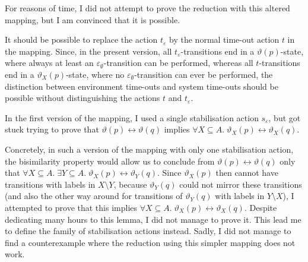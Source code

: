 \begin{isabellebody}
\begin{isamarkuptext}
For reasons of time, I did not attempt to prove the reduction with this altered mapping, but I am convinced that it is possible.%
\end{isamarkuptext}\isamarkuptrue%
%
\isadelimdocument
%
\endisadelimdocument
%
\isatagdocument
%
\isamarkuptrue%
%
\isamarkuptrue%
%
\endisatagdocument
{\isafolddocument}%
%
\isadelimdocument
%
\endisadelimdocument
%
\begin{isamarkuptext}%
It should be possible to replace the action $t_\varepsilon$ by the normal time-out action $t$ in the mapping. Since, in the present version, all $t_\varepsilon$-transitions end in a $\vartheta(p)$-state, where always at least an $\varepsilon_\emptyset$-transition can be performed, whereas all $t$-transitions end in a $\vartheta_X(p)$-state, where no $\varepsilon_\emptyset$-transition can ever be performed, the distinction between environment time-outs and system time-outs should be possible without distinguishing the actions $t$ and $t_\varepsilon$.
\pagebreak%
\end{isamarkuptext}\isamarkuptrue%
%
\isadelimdocument
%
\endisadelimdocument
%
\isatagdocument
%
\isamarkuptrue%
%
\endisatagdocument
{\isafolddocument}%
%
\isadelimdocument
%
\endisadelimdocument
%
\begin{isamarkuptext}%
In the first version of the mapping, I used a single stabilisation action $s_\varepsilon$, but got stuck trying to prove that $\vartheta(p) \leftrightarrow \vartheta(q)$ implies $\forall X \subseteq A .\; \vartheta_X(p) \leftrightarrow \vartheta_X(q)$. 

Concretely, in such a version of the mapping with only one stabilisation action, the bisimilarity property would allow us to conclude from \linebreak $\vartheta(p) \leftrightarrow \vartheta(q)$ only that $\forall X \subseteq A .\; \exists Y \subseteq A .\; \vartheta_X(p) \leftrightarrow \vartheta_Y(q)$. Since $\vartheta_X(p)$ then cannot have transitions with labels in $X \!\setminus\! Y$, because $\vartheta_Y(q)$ could not mirror these transitions (and also the other way around for transitions of $\vartheta_Y(q)$ with labels in $Y \!\setminus\! X$), I attempted to prove that this implies $\forall X \subseteq A .\; \vartheta_X(p) \leftrightarrow \vartheta_X(q)$. Despite dedicating many hours to this lemma, I did not manage to prove it. This lead me to define the family of stabilisation actions instead. Sadly, I did not manage to find a counterexample where the reduction using this simpler mapping does not work.


\end{isamarkuptext}
\end{isabellebody}
